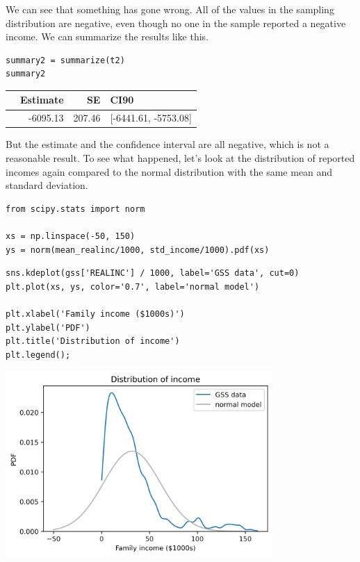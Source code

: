 We can see that something has gone wrong. All of the values in the
sampling distribution are negative, even though no one in the sample
reported a negative income. We can summarize the results like this.

\begin{lstlisting}[]
summary2 = summarize(t2)
summary2
\end{lstlisting}

\begin{tabular}{lrrl}
\midrule
{} &  Estimate &      SE &                  CI90 \\
\midrule
{} &  -6095.13 &  207.46 &  [-6441.61, -5753.08] \\
\midrule
\end{tabular}

But the estimate and the confidence interval are all negative, which is
not a reasonable result. To see what happened, let's look at the
distribution of reported incomes again compared to the normal
distribution with the same mean and standard deviation.

\begin{lstlisting}[]
from scipy.stats import norm

xs = np.linspace(-50, 150)
ys = norm(mean_realinc/1000, std_income/1000).pdf(xs)
\end{lstlisting}

\begin{lstlisting}[]
sns.kdeplot(gss['REALINC'] / 1000, label='GSS data', cut=0)
plt.plot(xs, ys, color='0.7', label='normal model')

plt.xlabel('Family income ($1000s)')
plt.ylabel('PDF')
plt.title('Distribution of income')
plt.legend();
\end{lstlisting}

\begin{center}
\includegraphics[width=4in]{chapters/12_bootstrap_files/12_bootstrap_42_0.png}
\end{center}

